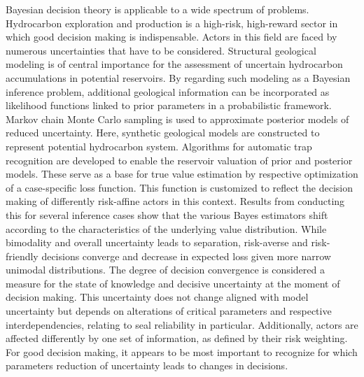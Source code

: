 \documentclass[a4paper,11pt]{MScThesis}
\begin{document}
%
\frontmatter %
%
    \maketitle
%


\cleardoublepage



Bayesian decision theory is applicable to a wide spectrum of problems. Hydrocarbon exploration and production is a high-risk, high-reward sector in which good decision making is indispensable. Actors in this field are faced by numerous uncertainties that have to be considered. Structural geological modeling is of central importance for the assessment of uncertain hydrocarbon accumulations in potential reservoirs. By regarding such modeling as a Bayesian inference problem, additional geological information can be incorporated as likelihood functions linked to prior parameters in a probabilistic framework. Markov chain Monte Carlo sampling is used to approximate posterior models of reduced uncertainty. Here, synthetic geological models are constructed to represent potential hydrocarbon system. Algorithms for automatic trap recognition are developed to enable the reservoir valuation of prior and posterior models. These serve as a base for true value estimation by respective optimization of a case-specific loss function. This function is customized to reflect the decision making of differently risk-affine actors in this context. Results from conducting this for several inference cases show that the various Bayes estimators shift according to the characteristics of the underlying value distribution. While bimodality and overall uncertainty leads to separation, risk-averse and risk-friendly decisions converge and decrease in expected loss given more narrow unimodal distributions. The degree of decision convergence is considered a measure for the state of knowledge and decisive uncertainty at the moment of decision making. This uncertainty does not change aligned with model uncertainty but depends on alterations of critical parameters and respective interdependencies, relating to seal reliability in particular. Additionally, actors are affected differently by one set of information, as defined by their risk weighting. For good decision making, it appears to be most important to recognize for which parameters reduction of uncertainty leads to changes in decisions.
\end{document}
